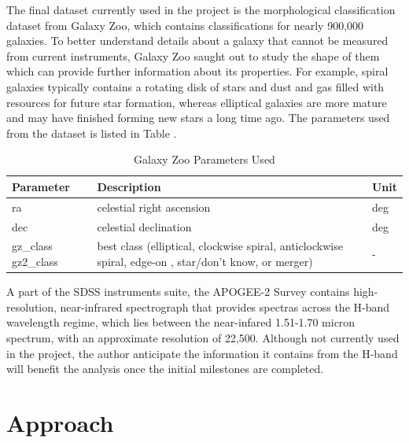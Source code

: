 \documentclass[11pt,sigconf]{acmart}
\begin{document}
The final dataset currently used in the project is the morphological classification dataset 
from Galaxy Zoo, which contains classifications for nearly 900,000 galaxies. To better 
understand details about a galaxy that cannot be measured from current instruments, Galaxy Zoo 
saught out to study the shape of them which can provide further information about its properties. 
For example, spiral galaxies typically contains a rotating disk of stars and dust and gas 
filled with resources for future star formation, whereas elliptical galaxies are more mature and 
may have finished forming new stars a long time ago. The parameters used from the dataset is listed 
in Table .

\begin{table}[]
  \begin{tabular}{ |p{1.8cm}|p{4.0cm}|p{1.0cm}|  } \hline
   \textbf{Parameter} & \textbf{Description} & \textbf{Unit}  \\ \hline
   ra & celestial right ascension  & deg \\ \hline
   dec & celestial declination & deg \\ \hline
   gz\_class gz2\_class & best class (elliptical, clockwise spiral, anticlockwise spiral, edge-on , star/don't know, or merger) & - \\ \hline
  \end{tabular}
  \caption{\label{tab:tablegzoo}Galaxy Zoo Parameters Used}
  \end{table}

A part of the SDSS instruments suite, the APOGEE-2 Survey
contains high-resolution, near-infrared spectrograph that provides spectras across the 
H-band wavelength regime, which lies between the near-infared 1.51-1.70 micron spectrum, 
with an approximate resolution of 22,500. Although not currently used in the project,
the author anticipate the information it contains from the H-band will benefit the
analysis once the initial milestones are completed. 
\\

\section{Approach}
\end{document}
